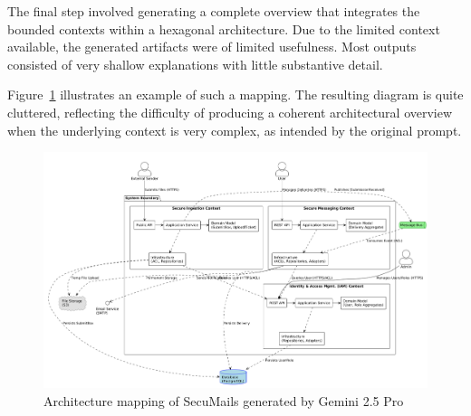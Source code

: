 The final step involved generating a complete overview that integrates the bounded contexts within a hexagonal architecture. Due to the limited context available, the generated artifacts were of limited usefulness. Most outputs consisted of very shallow explanations with little substantive detail.  

Figure~\ref{fig:architecture-mapping-gemini} illustrates an example of such a mapping. The resulting diagram is quite cluttered, reflecting the difficulty of producing a coherent architectural overview when the underlying context is very complex, as intended by the original prompt.  

\begin{figure}[htbp]
  \centering
  \begin{adjustbox}{max width=\textwidth}
      \includegraphics{figures/architecture-mapping-gemini.png} 
  \end{adjustbox}
  \caption{Architecture mapping of SecuMails generated by Gemini 2.5 Pro}
  \label{fig:architecture-mapping-gemini} 
\end{figure}